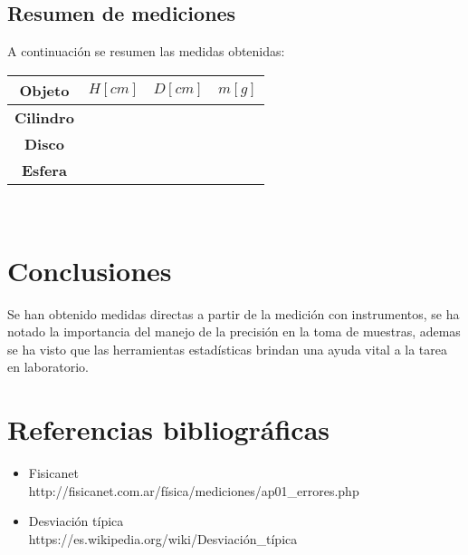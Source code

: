 \documentclass[letter,twoside,11pt]{article}
\begin{document}
\subsection{Resumen de mediciones}
A continuación se resumen las medidas obtenidas:

\begin{center}
\begin{tabular}{|c|>{\centering}m{2.0cm}<{\centering}
                  |>{\centering}m{2.0cm}<{\centering}
                  |>{\centering}m{2.0cm}<{\centering}|}
\hline
\textbf{Objeto} & \textbf{$H[cm]$}
             & \textbf{$D[cm]$}
             & \textbf{$m[g]$} \tabularnewline \hline
\textbf{Cilindro} & & & \\ \hline
\textbf{Disco} & & & \\ \hline
\textbf{Esfera} & & & \\ \hline
\end{tabular}\\
\end{center}

\section{Conclusiones}
Se han obtenido medidas directas a partir de la medición con instrumentos, se
ha notado la importancia del manejo de la precisión en la toma de muestras,
ademas se ha visto que las herramientas estadísticas brindan una ayuda vital a
la tarea en laboratorio.

\section{Referencias bibliográficas}
\begin{itemize}
\item Fisicanet \\
http://fisicanet.com.ar/física/mediciones/ap01\_errores.php
\item Desviación típica \\
https://es.wikipedia.org/wiki/Desviación\_típica
\end{itemize}
\end{document}
